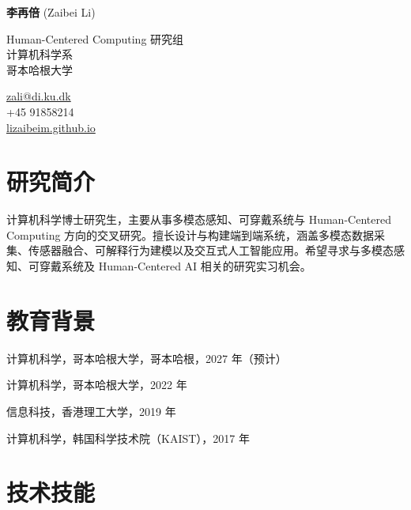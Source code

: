 \documentclass[11pt,letterpaper]{report}
\newcommand{\myname}{李再倍}
\newcommand{\mynameen}{Zaibei Li}
\newcommand{\namefont}[1]{{\normalfont\bfseries\Huge{#1}}}
\begin{document}
    \raggedright{}

    \namefont{\myname} {\normalfont\Large (\mynameen)}

    \vspace{1em}
    \begin{minipage}[t]{0.700\textwidth}
        Human-Centered Computing 研究组\\
        计算机科学系\\
        哥本哈根大学
    \end{minipage}%
    \begin{minipage}[t]{0.295\textwidth}
        \flushright{}
        \href{mailto:zali@di.ku.dk}{zali@di.ku.dk} \\
        +45 91858214 \\
        \href{https://lizaibeim.github.io}{lizaibeim.github.io}
    \end{minipage}

    \section*{研究简介}

    计算机科学博士研究生，主要从事多模态感知、可穿戴系统与 Human-Centered Computing 方向的交叉研究。擅长设计与构建端到端系统，涵盖多模态数据采集、传感器融合、可解释行为建模以及交互式人工智能应用。希望寻求与多模态感知、可穿戴系统及 Human-Centered AI 相关的研究实习机会。

    \section*{教育背景}

    \begin{tablist}

        \item[博士] \tab{}计算机科学，哥本哈根大学，哥本哈根，2027 年（预计）
        \item[硕士]  \tab{}计算机科学，哥本哈根大学，2022 年
        \item[学士]  \tab{}信息科技，香港理工大学，2019 年
        \item[交换生]  \tab{}计算机科学，韩国科学技术院（KAIST），2017 年

    \end{tablist}


    \section*{技术技能}
\end{document}
